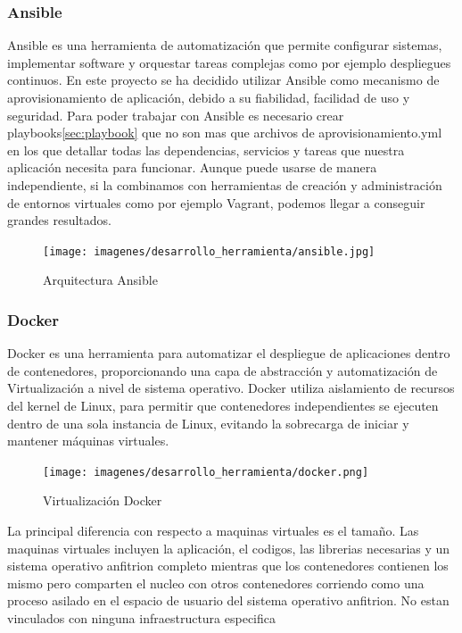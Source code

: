 \documentclass[a4paper,11pt]{book}
\begin{document}
\subsubsection{Ansible}

Ansible\cite{ans} es una herramienta de automatización que permite configurar sistemas, implementar software y orquestar tareas complejas como por ejemplo despliegues continuos. En este proyecto se ha decidido utilizar Ansible como mecanismo de aprovisionamiento de aplicación, debido a su fiabilidad, facilidad de uso y seguridad. Para poder trabajar con Ansible es necesario crear playbooks\ref{sec:playbook} que no son mas que archivos de aprovisionamiento.yml en los que detallar todas las dependencias, servicios y tareas que nuestra aplicación necesita para funcionar. Aunque puede usarse de manera independiente, si la combinamos con herramientas de creación y administración de entornos virtuales como por ejemplo Vagrant, podemos llegar a conseguir grandes resultados.

\begin{figure}[H] 
\centering 
\texttt{[image: imagenes/desarrollo\_herramienta/ansible.jpg]}
\caption{ Arquitectura Ansible\cite{ans2}}
\end{figure}



\subsubsection{Docker}

Docker\cite{dk} es una herramienta para automatizar el despliegue de aplicaciones dentro de contenedores, proporcionando una capa de abstracción y automatización de Virtualización a nivel de sistema operativo. Docker utiliza aislamiento de recursos del kernel de Linux, para permitir que contenedores independientes se ejecuten dentro de una sola instancia de Linux, evitando la sobrecarga de iniciar y mantener máquinas virtuales.

\begin{figure}[H] 
\centering 
\texttt{[image: imagenes/desarrollo\_herramienta/docker.png]}
\caption{ Virtualización Docker\cite{dkw}}
\end{figure}

La principal diferencia con respecto a maquinas virtuales es el tamaño. Las maquinas virtuales incluyen la aplicación, el codigos, las librerias necesarias y un sistema operativo anfitrion completo mientras que los contenedores contienen los mismo pero comparten el nucleo con otros contenedores corriendo como una proceso asilado en el espacio de usuario del sistema operativo anfitrion. No estan vinculados con ninguna infraestructura especifica 
\end{document}
